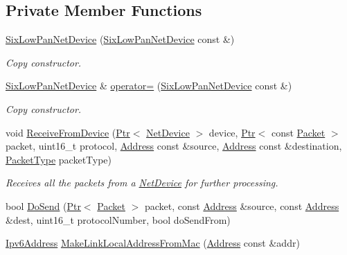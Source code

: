 \subsection*{Private Member Functions}
\begin{DoxyCompactItemize}
\item 
\hyperlink{classns3_1_1SixLowPanNetDevice_a7b1b0c2d523be22ddf04415ba080a5b7}{Six\+Low\+Pan\+Net\+Device} (\hyperlink{classns3_1_1SixLowPanNetDevice}{Six\+Low\+Pan\+Net\+Device} const \&)
\begin{DoxyCompactList}\small\item\em Copy constructor. \end{DoxyCompactList}\item 
\hyperlink{classns3_1_1SixLowPanNetDevice}{Six\+Low\+Pan\+Net\+Device} \& \hyperlink{classns3_1_1SixLowPanNetDevice_a1498e34db04e4293eecca96ed9b4f4a3}{operator=} (\hyperlink{classns3_1_1SixLowPanNetDevice}{Six\+Low\+Pan\+Net\+Device} const \&)
\begin{DoxyCompactList}\small\item\em Copy constructor. \end{DoxyCompactList}\item 
void \hyperlink{classns3_1_1SixLowPanNetDevice_a35d31ab6c6270f1923ce5b0f77d582b6}{Receive\+From\+Device} (\hyperlink{classns3_1_1Ptr}{Ptr}$<$ \hyperlink{classns3_1_1NetDevice}{Net\+Device} $>$ device, \hyperlink{classns3_1_1Ptr}{Ptr}$<$ const \hyperlink{classns3_1_1Packet}{Packet} $>$ packet, uint16\+\_\+t protocol, \hyperlink{classns3_1_1Address}{Address} const \&source, \hyperlink{classns3_1_1Address}{Address} const \&destination, \hyperlink{classns3_1_1NetDevice_ace65153f09144f55a0d3e702fc29d6b2}{Packet\+Type} packet\+Type)
\begin{DoxyCompactList}\small\item\em Receives all the packets from a \hyperlink{classns3_1_1NetDevice}{Net\+Device} for further processing. \end{DoxyCompactList}\item 
bool \hyperlink{classns3_1_1SixLowPanNetDevice_a0cd8b4fc52f256bd7743310434ac4680}{Do\+Send} (\hyperlink{classns3_1_1Ptr}{Ptr}$<$ \hyperlink{classns3_1_1Packet}{Packet} $>$ packet, const \hyperlink{classns3_1_1Address}{Address} \&source, const \hyperlink{classns3_1_1Address}{Address} \&dest, uint16\+\_\+t protocol\+Number, bool do\+Send\+From)
\item 
\hyperlink{classns3_1_1Ipv6Address}{Ipv6\+Address} \hyperlink{classns3_1_1SixLowPanNetDevice_acf66b0ff019d0f1b88212d452044696e}{Make\+Link\+Local\+Address\+From\+Mac} (\hyperlink{classns3_1_1Address}{Address} const \&addr)

\end{DoxyCompactItemize}

